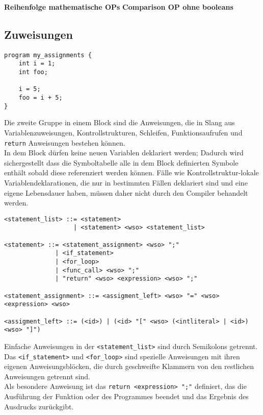 \textbf{Reihenfolge mathematische OPs}
\textbf{Comparison OP ohne booleans}\\

\subsection{Zuweisungen}

\begin{lstlisting}[caption={Slang Beispiel Zuweisungen}]
program my_assignments {
    int i = 1;
    int foo;

    i = 5;
    foo = i + 5;
}
\end{lstlisting}

Die zweite Gruppe in einem Block sind die Anweisungen, die in Slang aus Variablenzuweisungen, Kontrollstrukturen, Schleifen, Funktionsaufrufen und \texttt{return} Anweisungen bestehen können.\\

In dem Block dürfen keine neuen Variablen deklariert werden; Dadurch wird sichergestellt dass die Symboltabelle alle in dem Block definierten Symbole enthält sobald diese referenziert werden können.
Fälle wie Kontrollstruktur-lokale Variablendeklarationen, die nur in bestimmten Fällen deklariert sind und eine eigene Lebensdauer haben, müssen
daher nicht durch den Compiler behandelt werden.

\begin{lstlisting}[caption={Grammatikdefinition Zuweisungen}]
<statement_list> ::= <statement>
                   | <statement> <wso> <statement_list>

<statement> ::= <statement_assignment> <wso> ";"
              | <if_statement>
              | <for_loop>
              | <func_call> <wso> ";"
              | "return" <wso> <expression> <wso> ";"

<statement_assignment> ::= <assigment_left> <wso> "=" <wso> <expression> <wso>

<assigment_left> ::= (<id>) | (<id> "[" <wso> (<intliteral> | <id>) <wso> "]")
\end{lstlisting}

Einfache Anweisungen in der \texttt{<statement\_list>} sind durch Semikolons getrennt.
Das \texttt{<if\_statement>} und \texttt{<for\_loop>} sind spezielle Anweisungen mit ihren eigenen Anweisungsblöcken, die durch geschweifte Klammern von den restlichen Anweisungen getrennt sind.\\
Als besondere Anweisung ist das \texttt{return <expression> ";"} definiert, das die Ausführung der Funktion oder des Programmes beendet und das Ergebnis des Ausdrucks zurückgibt.

